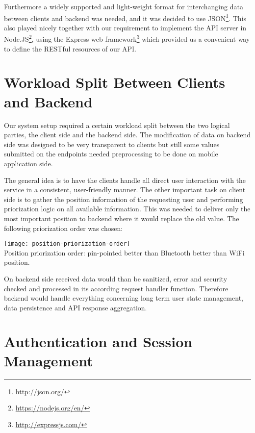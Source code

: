 Furthermore a widely supported and light-weight format for interchanging data between clients and backend was needed, and it was decided to use JSON\footnote{\url{http://json.org/}}. This also played nicely together with our requirement to implement the API server in Node.JS\footnote{\url{https://nodejs.org/en/}}, using the Express web framework\footnote{\url{http://expressjs.com/}} which provided us a convenient way to define the RESTful resources of our API.


\vspace{0.5cm}

\section{Workload Split Between Clients and Backend}

Our system setup required a certain workload split between the two logical parties, the client side and the backend side. The modification of data on backend side was designed to be very transparent to clients but still some values submitted on the endpoints needed preprocessing to be done on mobile application side.

The general idea is to have the clients handle all direct user interaction with the service in a consistent, user-friendly manner. The other important task on client side is to gather the position information of the requesting user and performing priorization logic on all available information. This was needed to deliver only the most important position to backend where it would replace the old value. The following priorization order was chosen:
\begin{center}
    \texttt{[image: position-priorization-order]}\\
    Position priorization order: pin-pointed better than Bluetooth better than WiFi position.
    \label{fig:position-priorization}
\end{center}

On backend side received data would than be sanitized, error and security checked and processed in its according request handler function. Therefore backend would handle everything concerning long term user state management, data persistence and API response aggregation.


\vspace{0.5cm}

\section{Authentication and Session Management}

